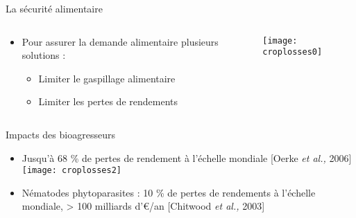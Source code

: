 \begin{frame}{La sécurité alimentaire }
\begin{columns}
\end{columns} 



\pause
\begin{columns}

 \begin{column}{.65\textwidth}
 \begin{outline}
	\begin{itemize}[itemsep=5pt]
	\item Pour assurer la demande alimentaire plusieurs solutions :
	
        \begin{itemize}[itemsep=6pt, label=$\rightarrow$] 
    \item Limiter le gaspillage alimentaire         
	  \item Limiter les pertes de rendements 
	\end{itemize} 
\end{itemize}
\end{outline}
 \end{column}
  \pause
 \begin{column}{.4\textwidth} 
\hspace{5mm}

\vspace{-7mm}
 \texttt{[image: croplosses0]} 
 \end{column}
\end{columns}
           
\end{frame}                                                                                                                                                    

\begin{frame}{Impacts des  bioagresseurs}


\begin{outline}
\begin{itemize}[itemsep=10pt]
\item  Jusqu'à 68 \% de pertes de rendement à l'échelle mondiale \textcolor{shadecolor}{{\small[Oerke \textit{et al.,} 2006]}}\\

               
      \hspace{15mm}
            \texttt{[image: croplosses2]}
        
               \vspace{-5mm}
 \item \textcolor{myblue2}{Nématodes phytoparasites} : 10 \% de pertes de rendements à l'échelle mondiale,    > 100 milliards d'\euro{}/an \textcolor{shadecolor}{{\small[Chitwood \textit{et al.,} 2003]}} 
\end{itemize}
\end{outline}
\end{frame}                                                                                                                                                    



